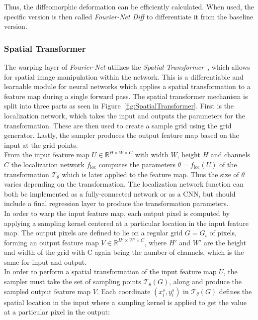\documentclass[english,version-2022-01]{uzl-thesis} %
\begin{document}
Thus, the diffeomorphic deformation can be efficiently calculated. When used, the specific version is then called \emph{Fourier-Net Diff} to differentiate it from the baseline version.


\subsubsection{Spatial Transformer} \label{SubSubSec:SpatialTransformer}
The warping layer of \emph{Fourier-Net} utilizes the \emph{Spatial Transformer}~\cite{SpatialTransformer}, which allows for spatial image manipulation within the network. This is a differentiable and learnable module for neural networks which applies a spatial transformation to a feature map during a single forward pass. The spatial transformer mechanism is split into three parts as seen in Figure~\ref{fig:SpatialTransformer}. First is the localization network, which takes the input and outputs the parameters for the transformation. These are then used to create a sample grid using the grid generator. Lastly, the sampler produces the output feature map based on the input at the grid points.\\
From the input feature map $U \in \mathbb{R}^{H \times W \times C}$ with width $W$, height $H$ and channels $C$ the localization network $f_{\text{loc}}$ computes the parameters $\theta = f_{\text{loc}}(U)$ of the transformation $\mathcal{T}_\theta$ which is later applied to the feature map. Thus the size of $\theta$ varies depending on the transformation. 
The localization network function can both be implemented as a fully-connected network or as a CNN, but should include a final regression layer to produce the transformation parameters.\\
In order to warp the input feature map, each output pixel is computed by applying a sampling kernel centered at a particular location in the input feature map. The output pixels are defined to lie on a regular grid $G = {G_i}$ of pixels, forming an output feature map $V \in \mathbb{R}^{H' \times W' \times C}$, where $H'$ and $W'$ are the height and width of the grid with C again being the number of channels, which is the same for input and output.\\
In order to perform a spatial transformation of the input feature map $U$, the sampler must take the set of sampling points $\mathcal{T}_\theta(G)$, along and produce the sampled output feature map $V$. Each coordinate $(x_i^s, y_i^s)$ in $\mathcal{T}_\theta(G)$ defines the spatial location in the input where a sampling kernel is applied to get the value at a particular pixel in the output:
\end{document}
